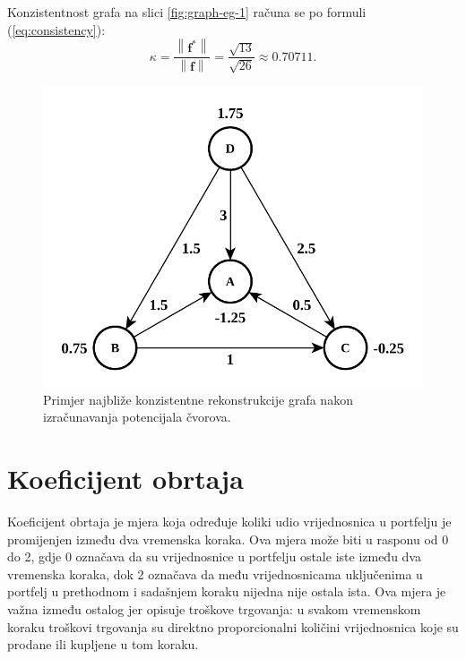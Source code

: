 \documentclass[lmodern, utf8, diplomski, numeric]{fer}
\newcommand{\matr}[1]{\mathbold{#1}}
\newcommand{\q}{\left}
\newcommand{\w}{\right}
\begin{document}
  Konzistentnost grafa na slici \ref{fig:graph-eg-1} računa se po formuli (\ref{eq:consistency}):
  \begin{equation*}
    \kappa = \frac{\q \lVert \matr{f^*} \w \rVert}{\q \lVert \matr{f} \w \rVert} = \frac{\sqrt{13}}{\sqrt{26}} \approx 0.70711.
  \end{equation*}
  
  \begin{figure}[h]
    \centering
    \includegraphics[width=0.619\linewidth]{graphics/graph-eg-2.pdf}
    \caption{Primjer najbliže konzistentne rekonstrukcije grafa nakon izračunavanja potencijala čvorova.}
    \label{fig:graph-eg-2}
  \end{figure}
  
  \section{Koeficijent obrtaja}
  \label{sc:turnover}
  Koeficijent obrtaja  je mjera koja određuje koliki udio vrijednosnica u portfelju je promijenjen između dva vremenska koraka.
  Ova mjera može biti u rasponu od 0 do 2, gdje 0 označava da su vrijednosnice u portfelju ostale iste između dva vremenska koraka, dok 2 označava da među vrijednosnicama uključenima u portfelj u prethodnom i sadašnjem koraku nijedna nije ostala ista.
  Ova mjera je važna između ostalog jer opisuje troškove trgovanja: u svakom vremenskom koraku troškovi trgovanja su direktno proporcionalni količini vrijednosnica koje su prodane ili kupljene u tom koraku.
  
\end{document}
